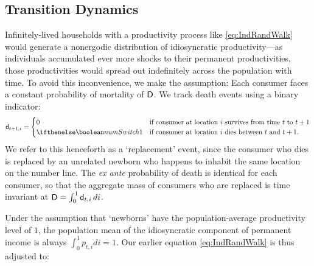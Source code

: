 \subsection{Transition Dynamics}

Infinitely-lived households with a productivity process like \eqref{eq:IndRandWalk} would generate a nonergodic distribution of idiosyncratic productivity---as individuals accumulated ever more shocks to their permanent productivities, those productivities would spread out indefinitely across the population with time. To avoid this inconvenience, we make the \cite{blanchardFinite} assumption: Each consumer faces a constant probability of mortality of $\mathsf{D}$. %
We track death events using a binary indicator:
\begin{equation*}
  \pDies_{t+1,i} =
  \begin{cases}
    0 & \text{if consumer at location $i$ survives from time $t$ to $t+1$}
    \\ \ifnumSw  1 & \text{if consumer at location $i$ dies between $t$ and $t+1$}.
  \end{cases}
\end{equation*}
We refer to this henceforth as a `replacement' event, since the consumer who dies is replaced by an unrelated newborn who happens to inhabit the same location on the number line.  The {\it ex ante} probability of death is identical for each consumer, so that the aggregate mass of consumers who are replaced is time invariant at $\mathsf{D} = \int_{0}^{1} \mathsf{d}_{t,i}\,di$.%

Under the assumption that `newborns' have the population-average productivity level of $1$, the population mean of the idiosyncratic component of permanent income is always $\int_{0}^{1} {p}_{t,i}di = 1$. %
Our earlier equation \eqref{eq:IndRandWalk} is thus adjusted to:%

